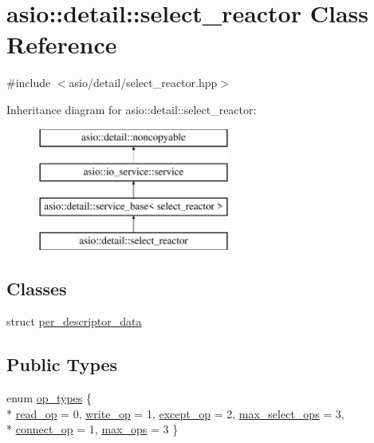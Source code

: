 \hypertarget{classasio_1_1detail_1_1select__reactor}{}\section{asio\+:\+:detail\+:\+:select\+\_\+reactor Class Reference}
\label{classasio_1_1detail_1_1select__reactor}


{\ttfamily \#include $<$asio/detail/select\+\_\+reactor.\+hpp$>$}

Inheritance diagram for asio\+:\+:detail\+:\+:select\+\_\+reactor\+:\begin{figure}[H]
\begin{center}
\leavevmode
\includegraphics[height=4.000000cm]{classasio_1_1detail_1_1select__reactor}
\end{center}
\end{figure}
\subsection*{Classes}
\begin{DoxyCompactItemize}
\item 
struct \hyperlink{structasio_1_1detail_1_1select__reactor_1_1per__descriptor__data}{per\+\_\+descriptor\+\_\+data}
\end{DoxyCompactItemize}
\subsection*{Public Types}
\begin{DoxyCompactItemize}
\item 
enum \hyperlink{classasio_1_1detail_1_1select__reactor_aa68ba3d214f9f046a27ad6b4ad743b37}{op\+\_\+types} \{ \\*
\hyperlink{classasio_1_1detail_1_1select__reactor_aa68ba3d214f9f046a27ad6b4ad743b37ab22de8bbf84e6d43de4e6f6a8bf70da5}{read\+\_\+op} = 0, 
\hyperlink{classasio_1_1detail_1_1select__reactor_aa68ba3d214f9f046a27ad6b4ad743b37a0d28233dd5e828b1e17ae9989d33a74d}{write\+\_\+op} = 1, 
\hyperlink{classasio_1_1detail_1_1select__reactor_aa68ba3d214f9f046a27ad6b4ad743b37a12faaedfaf78763570a2db254b6698df}{except\+\_\+op} = 2, 
\hyperlink{classasio_1_1detail_1_1select__reactor_aa68ba3d214f9f046a27ad6b4ad743b37a6ad9d2ec476a32b5c7d1edc68ada6504}{max\+\_\+select\+\_\+ops} = 3, 
\\*
\hyperlink{classasio_1_1detail_1_1select__reactor_aa68ba3d214f9f046a27ad6b4ad743b37af9e5ef1037c31bf9fcfc88032dc7f9e9}{connect\+\_\+op} = 1, 
\hyperlink{classasio_1_1detail_1_1select__reactor_aa68ba3d214f9f046a27ad6b4ad743b37a2fce81cdf971a8af0c04fa6fea53ca92}{max\+\_\+ops} = 3
 \}
\end{DoxyCompactItemize}
